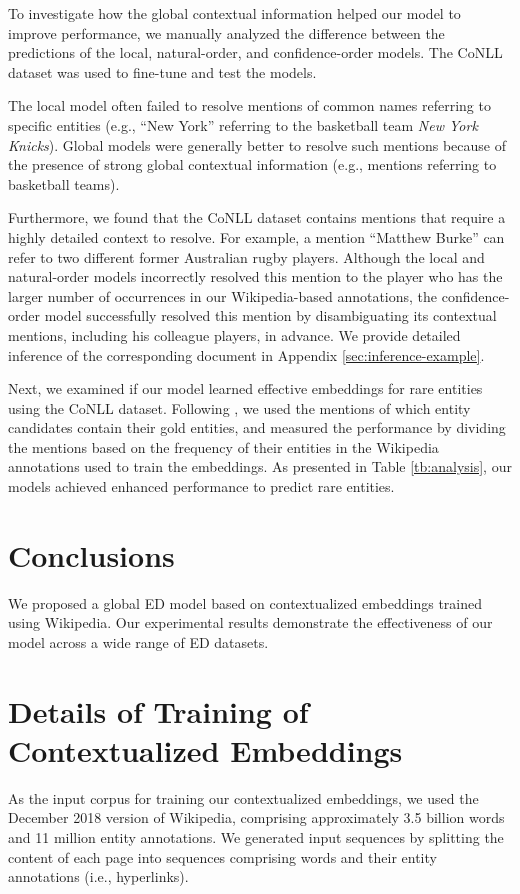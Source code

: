\documentclass[11pt,a4paper]{article}
\begin{document}
To investigate how the global contextual information helped our model to improve performance, we manually analyzed the difference between the predictions of the local, natural-order, and confidence-order models.
The CoNLL dataset was used to fine-tune and test the models.

The local model often failed to resolve mentions of common names referring to specific entities (e.g., ``New York'' referring to the basketball team \textit{New York Knicks}).
Global models were generally better to resolve such mentions because of the presence of strong global contextual information (e.g., mentions referring to basketball teams).

Furthermore, we found that the CoNLL dataset contains mentions that require a highly detailed context to resolve.
For example, a mention ``Matthew Burke'' can refer to two different former Australian rugby players.
Although the local and natural-order models incorrectly resolved this mention to the player who has the larger number of occurrences in our Wikipedia-based annotations, the confidence-order model successfully resolved this mention by disambiguating its contextual mentions, including his colleague players, in advance.
We provide detailed inference of the corresponding document in Appendix \ref{sec:inference-example}.

Next, we examined if our model learned effective embeddings for rare entities using the CoNLL dataset.
Following , we used the mentions of which entity candidates contain their gold entities, and measured the performance by dividing the mentions based on the frequency of their entities in the Wikipedia annotations used to train the embeddings.
As presented in Table \ref{tb:analysis}, our models achieved enhanced performance to predict rare entities.

\section{Conclusions}
We proposed a global ED model based on contextualized embeddings trained using Wikipedia.
Our experimental results demonstrate the effectiveness of our model across a wide range of ED datasets.




\clearpage

\appendix

\section{Details of Training of Contextualized Embeddings}
\label{sec:pretraining-details}
As the input corpus for training our contextualized embeddings, we used the December 2018 version of Wikipedia, comprising approximately 3.5 billion words and 11 million entity annotations.
We generated input sequences by splitting the content of each page into sequences comprising  words and their entity annotations (i.e., hyperlinks).
\end{document}
